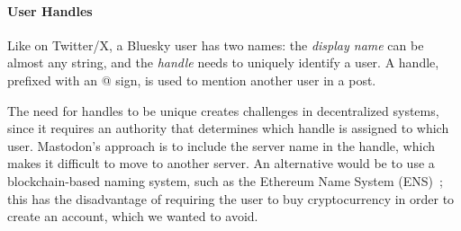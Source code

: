 \documentclass[sigconf]{acmart}
\newif\ifextendedversion
\begin{document}
\ifextendedversion\subsection{User Handles}\else\paragraph{User Handles}\fi

Like on Twitter/X, a Bluesky user has two names: the \emph{display name} can be almost any string, and the \emph{handle} needs to uniquely identify a user.
A handle, prefixed with an @ sign, is used to mention another user in a post.

The need for handles to be unique creates challenges in decentralized systems, since it requires an authority that determines which handle is assigned to which user.
Mastodon's approach is to include the server name in the handle, which makes it difficult to move to another server.
An alternative would be to use a blockchain-based naming system, such as the Ethereum Name System (ENS)~\cite{ENS}; this has the disadvantage of requiring the user to buy cryptocurrency in order to create an account, which we wanted to avoid.
\end{document}
